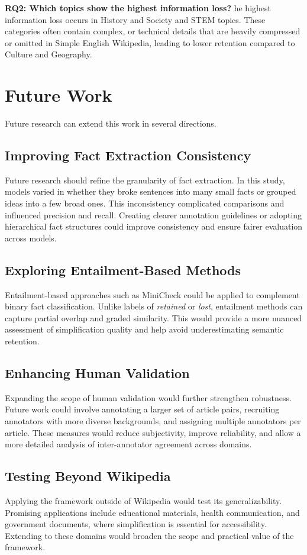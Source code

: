 \documentclass{DESSThesis}
\begin{document}
\textbf{RQ2: Which topics show the highest information loss?}  
he highest information loss occurs in History and Society and STEM topics. These categories often contain complex, or technical details that are heavily compressed or omitted in Simple English Wikipedia, leading to lower retention compared to Culture and Geography.

\section{Future Work}
Future research can extend this work in several directions.  

\subsection{Improving Fact Extraction Consistency}
Future research should refine the granularity of fact extraction. In this study, models varied in whether they broke sentences into many small facts or grouped ideas into a few broad ones. This inconsistency complicated comparisons and influenced precision and recall. Creating clearer annotation guidelines or adopting hierarchical fact structures could improve consistency and ensure fairer evaluation across models.  

\subsection{Exploring Entailment-Based Methods}
Entailment-based approaches such as MiniCheck could be applied to complement binary fact classification. Unlike labels of \textit{retained} or \textit{lost}, entailment methods can capture partial overlap and graded similarity. This would provide a more nuanced assessment of simplification quality and help avoid underestimating semantic retention.  

\subsection{Enhancing Human Validation}
Expanding the scope of human validation would further strengthen robustness. Future work could involve annotating a larger set of article pairs, recruiting annotators with more diverse backgrounds, and assigning multiple annotators per article. These measures would reduce subjectivity, improve reliability, and allow a more detailed analysis of inter-annotator agreement across domains.  

\subsection{Testing Beyond Wikipedia}
Applying the framework outside of Wikipedia would test its generalizability. Promising applications include educational materials, health communication, and government documents, where simplification is essential for accessibility. Extending to these domains would broaden the scope and practical value of the framework.  
\end{document}
